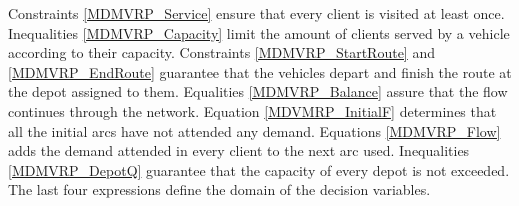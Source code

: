 \documentclass[preprint,review,12pt]{elsarticle}
\begin{document}
Constraints \eqref{MDMVRP_Service} ensure that every client is visited at least once. Inequalities \eqref{MDMVRP_Capacity} limit the amount of clients served by a vehicle according to their capacity. Constraints \eqref{MDMVRP_StartRoute} and \eqref{MDMVRP_EndRoute} guarantee that the vehicles depart and finish the route at the depot assigned to them. Equalities \eqref{MDMVRP_Balance} assure that the flow continues through the network. Equation \eqref{MDVMRP_InitialF} determines that all the initial arcs have not attended any demand. Equations \eqref{MDMVRP_Flow} adds the demand attended in every client to the next arc used. Inequalities \eqref{MDMVRP_DepotQ} guarantee that the capacity of every depot is not exceeded. The last four expressions define the domain of the decision variables.
\end{document}
